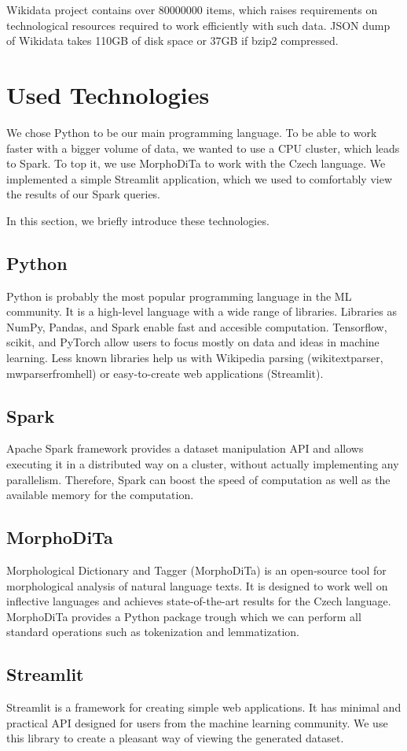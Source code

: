 Wikidata project contains over \num{80000000} items, which raises requirements on technological resources required to work efficiently with such data. JSON dump of Wikidata takes 110GB of disk space or 37GB if bzip2 compressed.



\section{Used Technologies}
We chose Python to be our main programming language. To be able to work faster with a bigger volume of data, we wanted to use a CPU cluster, which leads to Spark. To top it, we use MorphoDiTa to work with the Czech language. We implemented a simple Streamlit application, which we used to comfortably view the results of our Spark queries.

In this section, we briefly introduce these technologies.

\subsection{Python}
Python is probably the most popular programming language in the ML community. It is a high-level language with a wide range of libraries. Libraries as NumPy, Pandas, and Spark enable fast and accesible computation. Tensorflow, scikit, and PyTorch allow users to focus mostly on data and ideas in machine learning. Less known libraries help us with Wikipedia parsing (wikitextparser, mwparserfromhell) or easy-to-create web applications (Streamlit).

\subsection{Spark}
Apache Spark framework provides a dataset manipulation API and allows executing it in a distributed way on a cluster, without actually implementing any parallelism. Therefore, Spark can boost the speed of computation as well as the available memory for the computation.


\subsection{MorphoDiTa}

Morphological Dictionary and Tagger (MorphoDiTa) \citep{Morphodita} is an open-source tool for morphological analysis of natural language texts. It is designed to work well on inflective languages and achieves state-of-the-art results for the Czech language. MorphoDiTa provides a Python package trough which we can perform all standard operations such as tokenization and lemmatization.

\subsection{Streamlit}
Streamlit is a framework for creating simple web applications. It has minimal and practical API designed for users from the machine learning community. We use this library to create a pleasant way of viewing the generated dataset.





